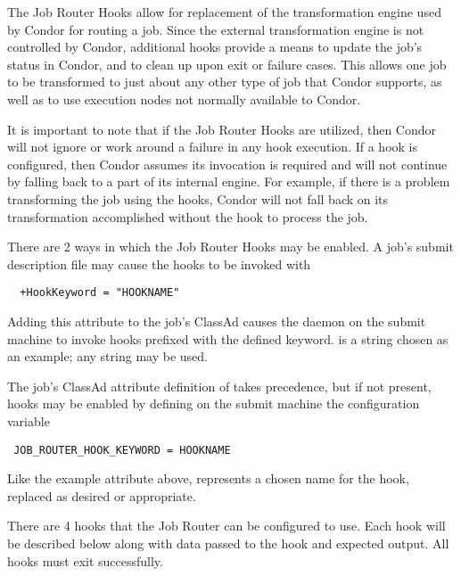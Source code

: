 The Job Router Hooks allow for replacement of the transformation engine used
by Condor for routing a job.
Since the external transformation engine is not controlled by Condor,
additional hooks provide a means to update the job's
status in Condor, and to clean up upon exit or failure cases.
This allows one job to be transformed to just about any other type of job
that Condor supports,
as well as to use execution nodes not normally available to Condor.

It is important to note that if the Job Router Hooks are utilized, 
then Condor will not ignore or work around a failure in any hook execution.
If a hook is configured,
then Condor assumes its invocation is required and will not
continue by falling back to a part of its internal engine.
For example,
if there is a problem transforming the job using the hooks,
Condor will not fall back on its transformation accomplished without the hook
to process the job.

There are 2 ways in which the Job Router Hooks may be enabled.
A job's submit description file may cause the hooks to be invoked with 
\footnotesize
\begin{verbatim}
  +HookKeyword = "HOOKNAME"
\end{verbatim}
\normalsize
Adding this attribute to the job's ClassAd causes the 
daemon on the submit machine to invoke hooks prefixed with the defined keyword.
 is a string chosen as an example; any string may be used.

The job's ClassAd attribute definition of  takes
precedence,
but if not present, hooks may be enabled by defining on the submit machine
the configuration variable 
\footnotesize
\begin{verbatim}
 JOB_ROUTER_HOOK_KEYWORD = HOOKNAME
\end{verbatim}
\normalsize
Like the example attribute above,
 represents a chosen name for the hook, 
replaced as desired or appropriate.

There are 4 hooks that the Job Router can be configured to use.
Each hook will be described below along with data passed 
to the hook and expected output.
All hooks must exit successfully.

